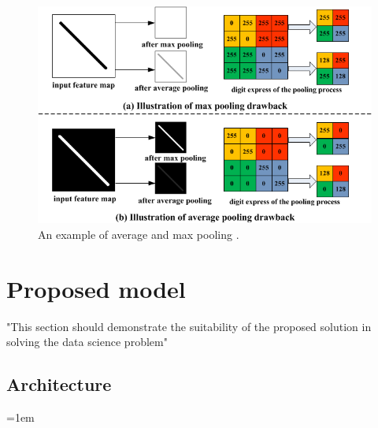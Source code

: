 \documentclass[12pt]{report}
\begin{document}
\begin{figure}[H]
    \centering
    \includegraphics[width=\textwidth]{Proposal/PoolingLayers.png}
    \caption{An example of average and max pooling \autocite{yuMixedPoolingConvolutional2014}.\label{fig:Pooling}}
\end{figure}


\chapter{Proposed model}
"This section should demonstrate the suitability of
the proposed solution in solving the data science problem"

\section{Architecture}\label{sec:ModelArchitecture}





\emergencystretch=1em
\printbibliography
\end{document}

